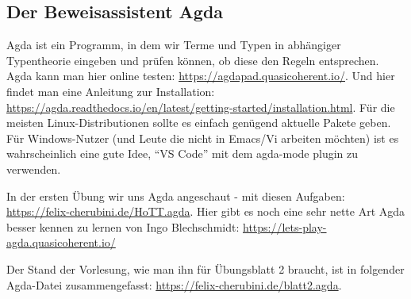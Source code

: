 \subsection{Der Beweisassistent Agda}
Agda ist ein Programm, in dem wir Terme und Typen in abhängiger Typentheorie eingeben und prüfen können, ob diese den Regeln entsprechen. Agda kann man hier online testen: \url{https://agdapad.quasicoherent.io/}. Und hier findet man eine Anleitung zur Installation: \url{https://agda.readthedocs.io/en/latest/getting-started/installation.html}. Für die meisten Linux-Distributionen sollte es einfach genügend aktuelle Pakete geben. Für Windows-Nutzer (und Leute die nicht in Emacs/Vi arbeiten möchten) ist es wahrscheinlich eine gute Idee, ``VS Code'' mit dem agda-mode plugin zu verwenden.

In der ersten Übung wir uns Agda angeschaut - mit diesen Aufgaben: \url{https://felix-cherubini.de/HoTT.agda}.
Hier gibt es noch eine sehr nette Art Agda besser kennen zu lernen von Ingo Blechschmidt:
\url{https://lets-play-agda.quasicoherent.io/}

Der Stand der Vorlesung, wie man ihn für Übungsblatt 2 braucht, ist in folgender Agda-Datei zusammengefasst: \url{https://felix-cherubini.de/blatt2.agda}.
